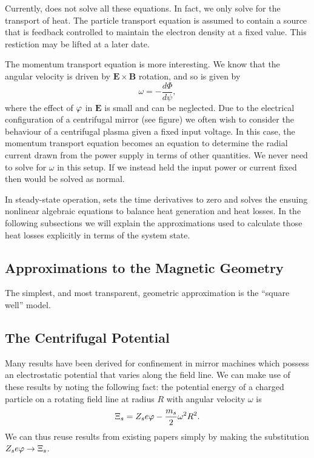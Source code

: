 \documentclass{revtex4}
\begin{document}
Currently, \mctrans{} does not solve all these equations. In fact, we only solve for the transport of heat. The particle transport equation is assumed to contain a 
source that is feedback controlled to maintain the electron density at a fixed value. This restiction may be lifted at a later date.

The momentum transport equation is more interesting. We know that the angular velocity is driven by $\bm{E}\times\bm{B}$ rotation, and so is given by
\begin{equation}
\omega = - \frac{d \Phi}{d\psi},
\end{equation}
where the effect of $\varphi$ in $\bm{E}$ is small and can be neglected.  Due to the electrical configuration of a centrifugal mirror (see figure) we often
wish to consider the behaviour of a centrifugal plasma given a fixed input voltage. In this case, the momentum transport equation becomes an equation to determine
the radial current drawn from the power supply in terms of other quantities. We never need to solve  for $\omega$ in this setup. If we instead held the input power or current fixed then  would be solved as normal.

In steady-state operation, \mctrans{} sets the time derivatives to zero and solves the ensuing nonlinear algebraic equations to balance heat generation and heat losses.
In the following subsections we will explain the approximations used to calculate those heat losses explicitly in terms of the system state.

\subsection{Approximations to the Magnetic Geometry}
The simplest, and most transparent, geometric approximation is the ``square well'' model.

\subsection{The Centrifugal Potential}

Many results have been derived for confinement in mirror machines which possess an electrostatic potential that varies along the field line. We can make use of these results by noting the following fact: the potential energy of a charged particle on a rotating field line at radius $R$ with angular velocity $\omega$ is
\begin{equation}
\Xi_s = Z_s e \varphi - \frac{m_s}{2} \omega^2 R^2.
\end{equation}
We can thus reuse results from existing papers simply by making the substitution $Z_s e\varphi \rightarrow \Xi_s$.
\end{document}
